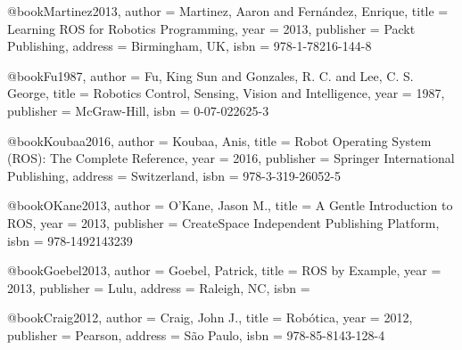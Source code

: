 %

%

@book{Martinez2013,
  author = {Martinez, Aaron and Fernández, Enrique},
  title = {Learning ROS for Robotics Programming},
  year = {2013},
  publisher = {Packt Publishing},
  address = {Birmingham, UK},
  isbn = {978-1-78216-144-8}
}

@book{Fu1987,
  author = {Fu, King Sun and Gonzales, R. C. and Lee, C. S. George},
  title = {Robotics Control, Sensing, Vision and Intelligence},
  year = {1987},
  publisher = {McGraw-Hill},
  isbn = {0-07-022625-3}
}

@book{Koubaa2016,
  author = {Koubaa, Anis},
  title = {Robot Operating System (ROS): The Complete Reference},
  year = {2016},
  publisher = {Springer International Publishing},
  address = {Switzerland},
  isbn = {978-3-319-26052-5}
}

@book{OKane2013,
  author = {O'Kane, Jason M.},
  title = {A Gentle Introduction to ROS},
  year = {2013},
  publisher = {CreateSpace Independent Publishing Platform},
  isbn = {978-1492143239}
}

@book{Goebel2013,
  author = {Goebel, Patrick},
  title = {ROS by Example},
  year = {2013},
  publisher = {Lulu},
  address = {Raleigh, NC},
  isbn = {}
}

%

@book{Craig2012,
  author = {Craig, John J.},
  title = {Robótica},
  year = {2012},
  publisher = {Pearson},
  address = {São Paulo},
  isbn = {978-85-8143-128-4}
}

